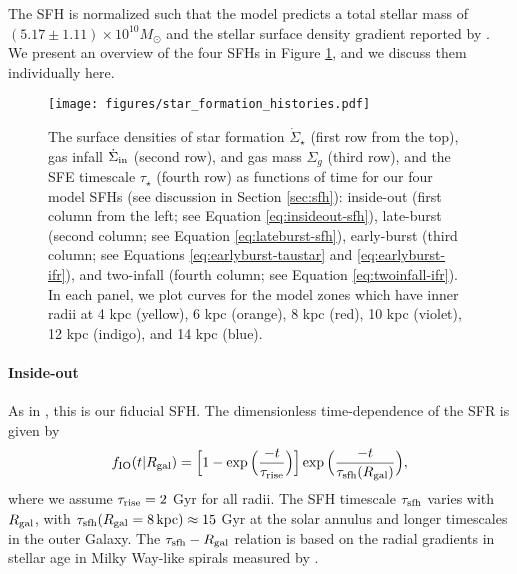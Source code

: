 \documentclass[twocolumn,twocolappendix]{aastex631}
\begin{document}
The SFH is normalized such that the model predicts a total stellar mass of $(5.17\pm1.11)\times10^{10} M_\odot$ \citep{LicquiaNewman2015-StellarMass} and the stellar surface density gradient reported by \citet[][see Appendix B of ]{BlandHawthornGerhard2016-MilkyWayReview}.
We present an overview of the four SFHs in Figure \ref{fig:sfhs}, and we discuss them individually here.

\begin{figure*}
    \centering
    \texttt{[image: figures/star\_formation\_histories.pdf]}
    \caption{The surface densities of star formation $\dot \Sigma_\star$ (first row from the top), gas infall $\dot \Sigma_{\rm in}$ (second row), and gas mass $\Sigma_g$ (third row), and the SFE timescale $\tau_\star$ (fourth row) as functions of time for our four model SFHs (see discussion in Section \ref{sec:sfh}): inside-out (first column from the left; see Equation \ref{eq:insideout-sfh}), late-burst (second column; see Equation \ref{eq:lateburst-sfh}), early-burst (third column; see Equations \ref{eq:earlyburst-taustar} and \ref{eq:earlyburst-ifr}), and two-infall (fourth column; see Equation \ref{eq:twoinfall-ifr}). In each panel, we plot curves for the model zones which have inner radii at 4 kpc (yellow), 6 kpc (orange), 8 kpc (red), 10 kpc (violet), 12 kpc (indigo), and 14 kpc (blue).}
    \label{fig:sfhs}
\end{figure*}

\paragraph{Inside-out} As in , this is our fiducial SFH. The dimensionless time-dependence of the SFR is given by
\begin{equation}
    f_{\rm IO}(t|R_{\rm gal}) = \Big[1 - \exp\Big(\frac{-t}{\tau_{\rm rise}}\Big)\Big] \exp\Big(\frac{-t}{\tau_{\rm sfh}(R_{\rm gal})}\Big),
    \label{eq:insideout-sfh}
\end{equation}
where we assume $\tau_{\rm rise}=2$ Gyr for all radii. The SFH timescale $\tau_{\rm sfh}$ varies with $R_{\rm gal}$, with $\tau_{\rm sfh}(R_{\rm gal}=8\,\rm{kpc})\approx15$ Gyr at the solar annulus and longer timescales in the outer Galaxy. The $\tau_{\rm sfh} - R_{\rm gal}$ relation is based on the radial gradients in stellar age in Milky Way-like spirals measured by \citet[][see Section 2.5 of  for details]{Sanchez2020-StarFormationTimescales}.
\end{document}
